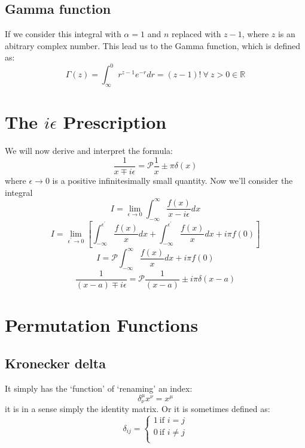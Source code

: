 \subsection{Gamma function}
If we consider this integral with $\alpha = 1$ and $n$ replaced with $z-1$, where $z$ is an abitrary complex number. This lead us to the Gamma function, which is defined as:
\begin{equation}
\Gamma (z) = \int^{0}_{\infty} r^{z-1} e^{-r} dr = (z-1)! \ \forall \ z > 0 \in \mathbb{R}
\end{equation}
\section{The $i \epsilon$ Prescription}
We will now derive and interpret the formula:
\begin{equation}
\frac{1}{x \mp i \epsilon} = \mathscr{P} \frac{1}{x} \pm \pi \delta (x)
\end{equation}
where $\epsilon \rightarrow 0$ is a positive infinitesimally small quantity. Now we'll consider the integral
\begin{equation}
	I = \lim_{\epsilon \rightarrow 0} \int_{- \infty}^{\infty} \frac{f(x)}{x - i \epsilon} dx
\end{equation}
$$	I = \lim_{\epsilon^{'} \rightarrow 0} \left[ \int_{- \infty}^{\epsilon^{'}} \frac{f(x)}{x} dx + \int_{- \infty}^{\epsilon^{'}} \frac{f(x)}{x} dx + i \pi f(0)\right]$$
\begin{equation}
I =   \mathscr{P}\int_{- \infty}^{\infty} \frac{f(x)}{x} dx + i \pi f(0)
\end{equation}
\begin{equation}
\frac{1}{(x-a)\mp i \epsilon} = \mathscr{P}\frac{1}{(x-a)}\pm i \pi \delta(x-a)
\end{equation}
\section{Permutation Functions}
\subsection{Kronecker delta}
It simply has the ‘function’ of ‘renaming’ an index:
$$\delta^{\mu}_{\nu} x^{\nu} = x^{\mu}$$
it is in a sense simply the identity matrix. Or it is sometimes defined as:
\begin{equation}
\delta_{ij} = \begin{cases}
1 \ \text{if } i = j \\
0 \ \text{if } i \neq j\\
\end{cases}
\end{equation}
